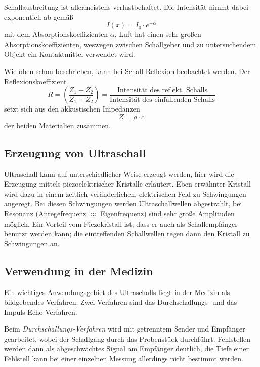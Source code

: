 \noindent
Schallausbreitung ist allermeistens verlustbehaftet. Die Intensität nimmt dabei exponentiell ab gemäß
\begin{equation}
	I(x) = I_0 \cdot e^{-\alpha}
\end{equation}
mit dem Absorptionskoeffizienten $\alpha$. Luft hat einen sehr großen Absorptionskoeffizienten, weswegen 
zwischen Schallgeber und zu untersuchendem Objekt ein Kontaktmittel verwendet wird.

\noindent
Wie oben schon beschrieben, kann bei Schall Reflexion beobachtet werden. Der Reflexionskoeffizient
\begin{equation}
	R = \left(\frac{Z_1 - Z_2}{Z_1 + Z_2} \right) 
	= \frac{\text{Intensität des reflekt. Schalls}}{\text{Intensität des einfallenden Schalls}}
\end{equation}
setzt sich aus den akkustischen Impedanzen 
\begin{equation}
	\label{eqn:impedanz}
	Z = \rho \cdot c
\end{equation}
der beiden Materialien zusammen.

\subsection{Erzeugung von Ultraschall}
\label{sec:Erzeugung von Ultraschall}

Ultraschall kann auf unterschiedlicher Weise erzeugt werden, hier wird die Erzeugung mittels
piezoelektrischer Kristalle erläutert. Eben erwähnter Kristall wird dazu in einem zeitlich
veränderlichen, elektrischen Feld zu Schwingungen angeregt. Bei diesen Schwingungen werden
Ultraschallwellen abgestrahlt, bei Resonanz (Anregefrequenz $\approx$ Eigenfrequenz) sind
sehr große Amplituden möglich.  Ein Vorteil vom Piezokristall ist, dass er auch als Schallempfänger
benutzt werden kann; die eintreffenden Schallwellen regen dann den Kristall zu Schwingungen an.

\subsection{Verwendung in der Medizin}
\label{sec:Verwendung in der Medizin}

Ein wichtiges Anwendungsgebiet des Ultraschalls liegt in der Medizin als bildgebendes Verfahren.
Zwei Verfahren sind das Durchschallungs- und das Impuls-Echo-Verfahren.

Beim \textit{Durchschallungs-Verfahren} wird mit getrenntem Sender und Empfänger gearbeitet, wobei der
Schallgang durch das Probenstück durchführt. Fehlstellen werden dann als abgeschwächtes Signal am
Empfänger deutlich, die Tiefe einer Fehlstell kann bei einer einzelnen Messung allerdings nicht
bestimmt werden.


